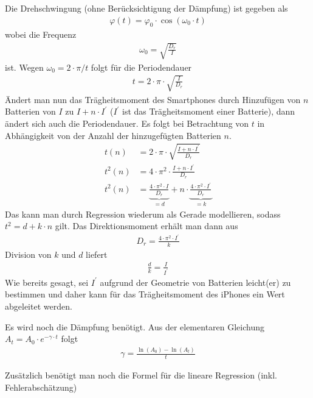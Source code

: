 \documentclass{article}
\begin{document}
Die Drehschwingung (ohne Berücksichtigung der Dämpfung) ist gegeben als
\begin{align}
\varphi(t) = \varphi_0 \cdot \cos(\omega_0 \cdot t)
\end{align}
wobei die Frequenz 
\begin{align}
\label{eq:kennfreq}
\omega_0 = \sqrt{\frac{D_r}{I}}
\end{align}
ist. Wegen $\omega_0 = 2\cdot \pi / t$ folgt für die Periodendauer
\begin{align*}
t = 2\cdot \pi \cdot \sqrt{\frac{I}{D_r}}
\end{align*}
Ändert man nun das Trägheitsmoment des Smartphones durch Hinzufügen von $n$ Batterien von $I$ zu $I + n\cdot I^\prime$ ($I^\prime$ ist das Trägheitsmoment einer Batterie), dann ändert sich auch die Periodendauer. Es folgt bei Betrachtung von $t$ in Abhängigkeit von der Anzahl der hinzugefügten Batterien $n$.
\begin{align*}
t(n) &= 2\cdot \pi \cdot \sqrt{\frac{I + n\cdot I^\prime}{D_r}} \\
t^2(n) &= 4\cdot \pi^2 \cdot \frac{I + n\cdot I^\prime}{D_r} \\
t^2(n) &= \underbrace{\frac{4\cdot \pi^2 \cdot I}{D_r}}_{=d} + n\cdot \underbrace{\frac{4\cdot\pi^2 \cdot I^\prime}{D_r}}_{=k}
\end{align*}
Das kann man durch Regression wiederum als Gerade modellieren, sodass $t^2 = d + k\cdot n$ gilt. Das Direktionsmoment erhält man dann aus
\begin{align}
D_r = \frac{4\cdot\pi^2\cdot I^\prime}{k}
\end{align}
Division von $k$ und $d$ liefert
\begin{align}
\frac{d}{k} = \frac{I}{I^\prime}
\end{align}
Wie bereits gesagt, sei $I^\prime$ aufgrund der Geometrie von Batterien leicht(er) zu bestimmen und daher kann für das Trägheitsmoment des iPhones ein Wert abgeleitet werden.

Es wird noch die Dämpfung benötigt. Aus der elementaren Gleichung $A_t = A_0\cdot e^{-\gamma\cdot t}$ folgt
\begin{align}
\gamma = \frac{\ln(A_0) - \ln(A_t)}{t}
\end{align}


Zusätzlich benötigt man noch die Formel für die lineare Regression (inkl. Fehlerabschätzung)



\end{document}
